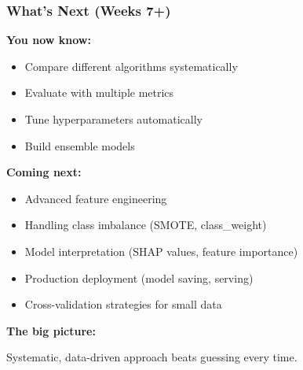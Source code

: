 \documentclass{beamer}
\begin{document}
\begin{frame}[fragile]
\frametitle{What's Next (Weeks 7+)}

\textbf{You now know:}

\begin{itemize}
    \item[\checkmark] Compare different algorithms systematically
    \item[\checkmark] Evaluate with multiple metrics
    \item[\checkmark] Tune hyperparameters automatically
    \item[\checkmark] Build ensemble models
\end{itemize}

\vspace{0.3cm}
\textbf{Coming next:}

\begin{itemize}
    \item Advanced feature engineering
    \item Handling class imbalance (SMOTE, class\_weight)
    \item Model interpretation (SHAP values, feature importance)
    \item Production deployment (model saving, serving)
    \item Cross-validation strategies for small data
\end{itemize}

\vspace{0.3cm}
\textbf{The big picture:}

Systematic, data-driven approach beats guessing every time.

\end{frame}
\end{document}
